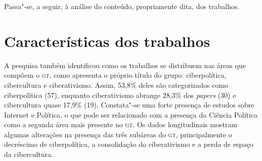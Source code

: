 Passa"-se, a seguir, à análise do conteúdo, propriamente dita, dos
trabalhos.

\section{Características dos trabalhos}

A pesquisa também identificou como os trabalhos se distribuem nas áreas
que compõem o \textsc{gt}, como apresenta o próprio título do grupo:
ciberpolítica, cibercultura e ciberativismo. Assim, 53,8\% deles são
categorizados como ciberpolítica (57), enquanto ciberativismo abrange
28,3\% dos \emph{papers} (30) e cibercultura quase 17,9\% (19).
Constata"-se uma forte presença de estudos sobre Internet e Política, o
que pode ser relacionado com a presença da Ciência Política como a
segunda área mais presente no \textsc{gt}. Os dados longitudinais mostram algumas
alterações na presença das três subáreas do \textsc{gt}, principalmente o
decréscimo de ciberpolítica, a consolidação do ciberativismo e a perda
de espaço da cibercultura.


